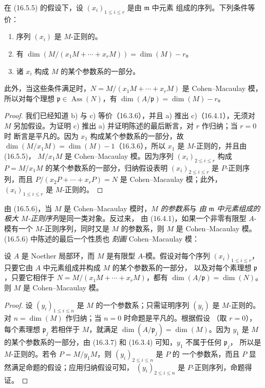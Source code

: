 \begin{corollary}[16.5.6]
\label{0.16.5.6-fr}
在 (16.5.5) 的假设下，设 $(x_i)_{1\leq i\leq r}$ 是由 $\mathfrak{m}$ 中元素
组成的序列。下列条件等价：
\begin{enumerate}
  \item[a)] 序列 $(x_i)$ 是 $M$-正则的。
  \item[b)] 有
  $\dim(M/(x_1M+\cdots+x_rM))=\dim(M)-r$。
  \item[c)] 诸 $x_i$ 构成 $M$ 的某个参数系的一部分。
\end{enumerate}
此外，当这些条件满足时，$N=M/(x_1M+\cdots+x_rM)$ 是 Cohen--Macaulay 模，
所以对每个理想 $\mathfrak{p}\in\operatorname{Ass}(N)$，有
$\dim(A/\mathfrak{p})=\dim(M)-r$。
\end{corollary}

\begin{proof}
我们已经知道 b) 与 c) 等价（16.3.6），并且 a) 推出 c)（16.4.1），无须对 $M$
另加假设。为证明 c) 推出 a) 并证明陈述的最后断言，对 $r$ 作归纳；当 $r=0$ 时
断言是平凡的。因为 $x_1$ 构成某个参数系的一部分，故
$\dim(M/x_1M)=\dim(M)-1$（16.3.6），所以 $x_1$ 是 $M$-正则的，并且由 (16.5.5)，
$M/x_1M$ 是 Cohen--Macaulay 模。因为序列 $(x_i)_{2\leq i\leq r}$ 构成
$P=M/x_1M$ 的某个参数系的一部分，归纳假设表明 $(x_i)_{2\leq i\leq r}$ 是
$P$-正则序列，而且 $P/(x_2P+\cdots+x_rP)=N$ 是 Cohen--Macaulay 模；此外，
$(x_i)_{1\leq i\leq r}$ 是 $M$-正则的。
\end{proof}

\begin{remark}[16.5.7]
\label{0.16.5.7-fr}
由 (16.5.6)，当 $M$ 是 Cohen--Macaulay 模时，\emph{$M$ 的参数系}与
\emph{由 $\mathfrak{m}$ 中元素组成的极大 $M$-正则序列}是同一类对象。反过来，
由 (16.4.1)，如果一个非零有限型 $A$-模有一个 $M$-正则序列，同时又是 $M$
的参数系，则 $M$ 是 Cohen--Macaulay 模。(16.5.6) 中陈述的最后一个性质也
\emph{刻画} Cohen--Macaulay 模：
\end{remark}

\begin{proposition}[16.5.8]
\label{0.16.5.8-fr}
设 $A$ 是 Noether 局部环，而 $M$ 是有限型 $A$-模。假设对每个序列
$(x_i)_{1\leq i\leq r}$，只要它由 $A$ 中元素组成并构成 $M$ 的某个参数系的一部分，
以及对每个素理想 $\mathfrak{p}$，只要它相伴于
$N=M/(x_1M+\cdots+x_rM)$，都有
$\dim(A/\mathfrak{p})=\dim(N)$。则 $M$ 是 Cohen--Macaulay 模。
\end{proposition}

\begin{proof}
设 $(y_i)_{1\leq i\leq n}$ 是 $M$ 的一个参数系；只需证明序列 $(y_i)$ 是
$M$-正则的。对 $n=\dim(M)$ 作归纳；当 $n=0$ 时命题是平凡的。根据假设
（取 $r=0$），每个素理想 $\mathfrak{p}_j$ 若相伴于 $M$，就满足
$\dim(A/\mathfrak{p}_j)=\dim(M)$。因为 $y_1$ 是
$M$ 的某个参数系的一部分，由 (16.3.7) 和 (16.3.4) 可知，$y_1$ 不属于任何 $\mathfrak{p}_j$，
所以是 $M$-正则的。若令 $P=M/y_1M$，则 $(y_i)_{2\leq i\leq n}$ 是 $P$ 的
一个参数系，而且 $P$ 显然满足命题的假设；应用归纳假设可知，
$(y_i)_{2\leq i\leq n}$ 是 $P$-正则序列，命题得证。
\end{proof}

